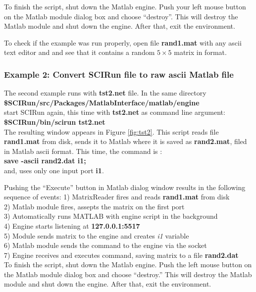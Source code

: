 To finish the script, shut down the Matlab engine. 
Push your left mouse button on the
Matlab module dialog box and choose ``destroy''. This will destroy
the Matlab module and shut down the engine. After that, exit
the \sr{} environment. 

To check if the example was run properly, open file {\bf rand1.mat }
with any ascii text editor and and see that it contains a random
$5 \times 5$ matrix in \sr{} format. 

\subsubsection{Example 2: Convert SCIRun file to raw ascii Matlab file} \indent

The second example runs with {\bf tst2.net} file. In the same
directory \\
{\bf \$SCIRun/src/Packages/MatlabInterface/matlab/engine } \\
start SCIRun again, this time with {\bf tst2.net} as command line argument: \\
{\bf \$SCIRun/bin/scirun  tst2.net} \\

The resulting window appears in Figure \ref{fig:tst2}. This
script reads \sr{} file {\bf rand1.mat} from disk, sends
it to Matlab where it is saved as {\bf rand2.mat}, filed
in Matlab ascii format. This time, the command is : \\
{\bf save -ascii rand2.dat i1;} \\
and, uses only one input port {\bf i1}. 

Pushing the
``Execute'' button in Matlab dialog window results in
the following sequence of events:
1) MatrixReader fires and reads {\bf rand1.mat} from disk \\
2) Matlab module fires, assepts the matrix on the first port \\
3) Automatically runs MATLAB with engine script in the background  \\
4) Engine starts listening at {\bf 127.0.0.1:5517} \\
5) Module sends matrix to the engine and creates {\it i1} variable\\
6) Matlab module sends the command to the engine via the socket\\
7) Engine receives and executes command, saving matrix to a file {\bf rand2.dat} \\

To finish the script, shut down the Matlab engine.
Push the left mouse button on the
Matlab module dialog box and choose ``destroy.'' This will destroy
the Matlab module and shut down the engine. After that, exit
the \sr{} environment.

